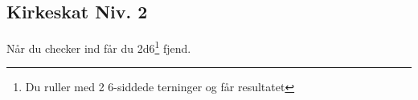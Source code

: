 \subsection{Kirkeskat Niv. 2}
Når du checker ind får du 2d6\footnote{Du ruller med 2 6-siddede terninger og får resultatet} fjend.
